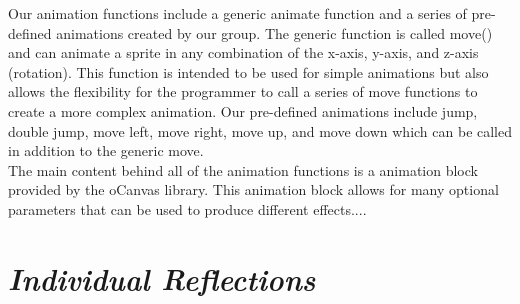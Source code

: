 \documentclass[12pt]{article}
\begin{document}
Our animation functions include a generic animate function and a series of pre-defined animations created by our group. The generic function is called move() and can animate a sprite in any combination of the x-axis, y-axis, and z-axis (rotation). This function is intended to be used for simple animations but also allows the flexibility for the programmer to call a series of move functions to create a more complex animation. Our pre-defined animations include jump, double jump, move left, move right, move up, and move down which can be called in addition to the generic move.\\

The main content behind all of the animation functions is a animation block provided by the oCanvas library. This animation block allows for many optional parameters that can be used to produce different effects....
\section{\emph{Individual Reflections}}
\end{document}
